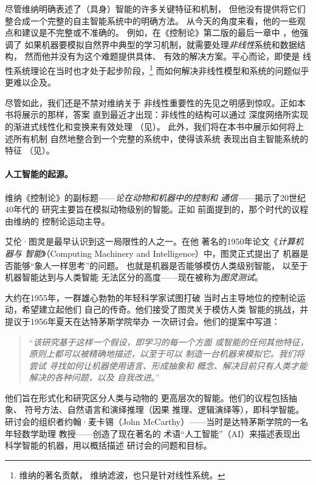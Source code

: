 \documentclass[../../book-main_zh.tex]{subfiles}
\begin{document}
尽管维纳明确表述了（具身）智能的许多关键特征和机制，
但他没有提供将它们整合成一个完整的自主智能系统中的明确方法。
从今天的角度来看，他的一些观点和建议是不完整或不准确的。
例如，在《控制论》第二版的最后一章中
\cite{Wiener-Cybernetics-1961}，他强调了
如果机器要模拟自然界中典型的学习机制，就需要处理\textit{非线性}系统和数据结构，
然而他并没有为这个难题提供具体、
有效的解决方案。平心而论，即使是
线性系统理论在当时也才处于起步阶段，\footnote{维纳的著名贡献，
维纳滤波\cite{Wiener-1942,Wiener-1949}，也只是针对线性系统。} 
而如何解决非线性模型和系统的问题似乎更难以企及。

尽管如此，我们还是不禁对维纳关于
非线性重要性的先见之明感到惊叹。正如本书将展示的那样，答案
直到最近才出现：非线性的结构可以通过
深度网络所实现的渐进式线性化和变换来有效处理
（见）。
此外，我们将在本书中展示如何将上述所有机制
自然地整合到一个完整的系统中，使得该系统
表现出自主智能系统的特征
（见）。

\paragraph{人工智能的起源。}
维纳《控制论》的副标题——\textit{论在动物和机器中的控制和
通信}——揭示了20世纪40年代的
研究主要旨在模拟动物级别的智能。正如
前面提到的，那个时代的议程由维纳的
控制论运动主导。

艾伦·图灵是最早认识到这一局限性的人之一。在他
著名的1950年论文《\textit{计算机器与
智能}》（Computing Machinery and
Intelligence）\cite{Turing-1950}中，图灵正式提出了
机器是否能够“象人一样思考”的问题。
也就是机器是否能够模仿人类级别智能，
以至于机器智能达到与人类智能
无法区分的高度——现在被称为\textit{图灵测试}。

大约在1955年，一群雄心勃勃的年轻科学家试图打破
当时占主导地位的控制论运动，希望建立起他们
自己的传奇。他们接受了图灵关于模仿人类
智能的挑战，并提议于1956年夏天在达特茅斯学院举办
一次研讨会。他们的提案中写道\cite{McCarthy-1955}：
\begin{quote}
    ``\textit{该研究基于这样一个假设，即学习的每一个方面
        或智能的任何其他特征，
        原则上都可以被精确地描述，以至于可以
        制造一台机器来模拟它。我们将尝试
        寻找如何让机器使用语言、形成抽象和
        概念、解决目前只有人类才能解决的各种问题，以及
    自我改进}。''
\end{quote}
他们旨在形式化和研究区分人类与动物的
更高层次的智能。他们的议程包括抽象、
符号方法、自然语言和演绎推理（因果
推理、逻辑演绎等），即科学智能。
研讨会的组织者约翰·麦卡锡（John McCarthy）——当时是达特茅斯学院的一名年轻数学助理
教授——创造了现在著名的
术语“人工智能”（AI）来描述表现出
科学智能的机器，用以概括描述
研讨会的问题和目标。
\end{document}
